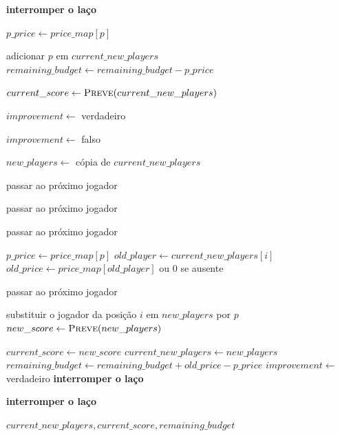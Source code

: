 \begin{breakablealgorithm}
\begin{algorithmic}[1]
        \State \textbf{interromper o laço}
    \EndIf

    \State $p\_price \gets price\_map[p]$

        \State adicionar $p$ em $current\_new\_players$
        \State $remaining\_budget \gets remaining\_budget - p\_price$
    \EndIf
\EndFor

\State $current\_score \gets \textsc{Preve}(current\_new\_players)$

\State $improvement \gets$ verdadeiro

    \State $improvement \gets$ falso

        \State $new\_players \gets$ cópia de $current\_new\_players$


                \State passar ao próximo jogador
            \EndIf

                \State passar ao próximo jogador
            \EndIf

                \State passar ao próximo jogador
            \EndIf

            \State $p\_price \gets price\_map[p]$
            \State $old\_player \gets current\_new\_players[i]$
            \State $old\_price \gets price\_map[old\_player]$ ou $0$ se ausente

                \State passar ao próximo jogador
            \EndIf

            \State substituir o jogador da posição $i$ em $new\_players$ por $p$
            \State $new\_score \gets \textsc{Preve}(new\_players)$

                \State $current\_score \gets new\_score$
                \State $current\_new\_players \gets new\_players$
                \State $remaining\_budget \gets remaining\_budget + old\_price - p\_price$
                \State $improvement \gets$ verdadeiro
                \State \textbf{interromper o laço}
            \EndIf

        \EndFor

            \State \textbf{interromper o laço}
        \EndIf

    \EndFor
\EndWhile

\State \Return $current\_new\_players, current\_score, remaining\_budget$

\EndFunction

\end{algorithmic}
\end{breakablealgorithm}